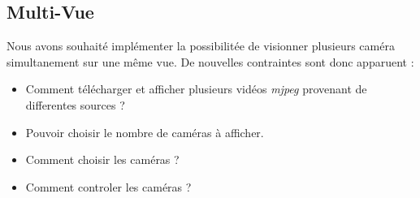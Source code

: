 \subsection{Multi-Vue}
Nous avons souhaité implémenter la possibilitée de visionner plusieurs caméra
simultanement sur une même vue. De nouvelles contraintes sont donc apparuent : 
\begin{itemize}
  \item Comment télécharger et afficher plusieurs vidéos \textit{mjpeg}
  provenant de differentes sources ?
  \item Pouvoir choisir le nombre de caméras à afficher.
  \item Comment choisir les caméras ?
  \item Comment controler les caméras ?
\end{itemize}

